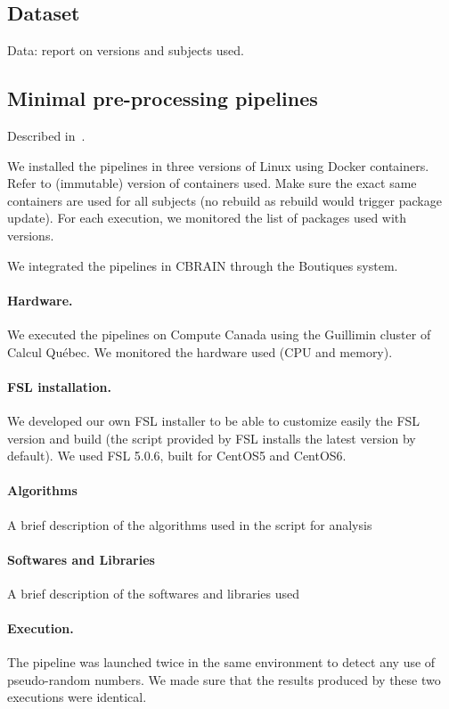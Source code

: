 \documentclass{article}
\begin{document}
\subsection{Dataset}

Data: report on versions and subjects used.

\subsection{Minimal pre-processing pipelines}

Described in~\cite{glasser2013minimal}.

We installed the pipelines in three versions of Linux using Docker
containers. Refer to (immutable) version of containers used. Make sure
the exact same containers are used for all subjects (no rebuild as
rebuild would trigger package update). For each execution, we
monitored the list of packages used with versions.

We integrated the pipelines in CBRAIN through the Boutiques system.

\paragraph{Hardware.} We executed the pipelines on Compute Canada
using the Guillimin cluster of Calcul Qu\'ebec. We monitored the
hardware used (CPU and memory). 

\paragraph{FSL installation.} We developed our own FSL installer to be
able to customize easily the FSL version and build (the script
provided by FSL installs the latest version by default). We used FSL
5.0.6, built for CentOS5 and CentOS6.

\paragraph{Algorithms}
A brief description of the algorithms used in the script for analysis

\paragraph{Softwares and Libraries}
A brief description of the softwares and libraries used

\paragraph{Execution.} The pipeline was launched twice in the same
environment to detect any use of pseudo-random numbers. We
made sure that the results produced by these two executions were
identical.
\end{document}
